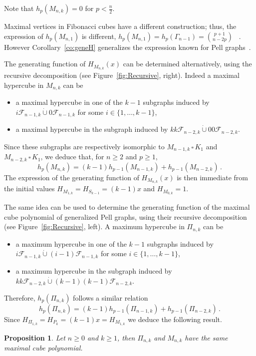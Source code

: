 \documentclass[11pt]{article}
\newtheorem{proposition}[theorem]{\bf Proposition}
\newcommand{\Fib}{{\mathcal F}}
\def\cp{\,\square\,}
\begin{document}
Note that $h_p(M_{n,k})=0$ for $p<\frac{n}{2}$. 

Maximal vertices in Fibonacci cubes have a different construction; thus, the expression of $h_p(M_{n,1})$ is different, $h_p(M_{n,1})=h_p(\Gamma_{n-1})=\binom{p+1}{n-2p}$~ \cite[Proposition~2.5]{M-2012a}. However Corollary~\ref{co:geneH} generalizes the expression known for Pell graphs~\cite[Theorem~9.70]{EKM-2023}.


The generating function of $ H_{M_{n,k}}(x)$ can be determined alternatively, using the recursive decomposition (see Figure~\ref{fig:Recursive}, right).  Indeed a maximal hypercube in $M_{n,k}$ can be
\begin{itemize}
\item a maximal hypercube in one of the $k-1$ subgraphs induced by $i\Fib_{n-1,k}\dot{\cup} 0\Fib_{n-1,k}$ for some $i\in\{1,\ldots,k-1\}$,
\item a maximal hypercube in the  subgraph induced by $kk\Fib_{n-2,k}\dot{\cup} 00\Fib_{n-2,k}$.
\end{itemize}
Since these subgraphs are respectively isomorphic to $M_{n-1,k}\cp K_1$ and $M_{n-2,k}\cp K_1$, we deduce that, for $n\geq 2 $ and $p \geq 1$,
\begin{equation}\label{eq:hp}
 h_p(M_{n,k})= (k-1)h_{p-1}(M_{n-1,k})+ h_{p-1}(M_{n-2,k})\,.
\end{equation}
The expression of the generating  function of $ H_{M_{n,k}}(x)$ is then immediate from  the initial values $H_{M_{1,k}}=H_{S_{k-1}}=(k-1)x$ and $H_{M_{0,k}}=1$.

The same idea can be used to determine  the generating function of the maximal cube polynomial  of generalized  Pell graphs, using their recursive decomposition (see Figure~\ref{fig:Recursive}, left). A maximum hypercube in $\Pi_{n,k}$ can be
\begin{itemize}
\item a maximum hypercube in one of the $k-1$ subgraphs induced by $i\Fib_{n-1,k}\dot{\cup}(i-1)\Fib_{n-1,k}$ for some $i\in\{1,\ldots,k-1\}$,
\item a maximum hypercube in the  subgraph induced by $kk\Fib_{n-2,k}\dot{\cup} (k-1)(k-1)\Fib_{n-2,k}$.
\end{itemize} 
Therefore, $h_p(\Pi_{n,k})$ follows a similar relation
\begin{equation}\label{eq:hpM}
 h_p(\Pi_{n,k})= (k-1)h_{p-1}(\Pi_{n-1,k})+ h_{p-1}(\Pi_{n-2,k})\,.
\end{equation}
Since $H_{\Pi_{1,k}}=H_{P_{k}}= (k-1)x= H_{M_{1,k}}$ we deduce the following result.
\begin{proposition}
Let $n\geq0$ and  $k\geq 1$,  then  $\Pi_{n,k}$ and  $M_{n,k}$ have the same maximal cube polynomial. 
\end{proposition}
\end{document}
